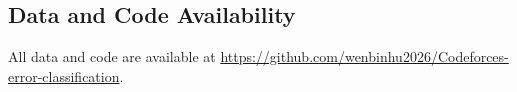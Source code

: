 \documentclass[10pt,letterpaper]{article}
\begin{document}
\subsection*{Data and Code Availability}
\begin{sloppypar}\raggedright
All data and code are available at \url{https://github.com/wenbinhu2026/Codeforces-error-classification}.
\end{sloppypar}




\end{document}
